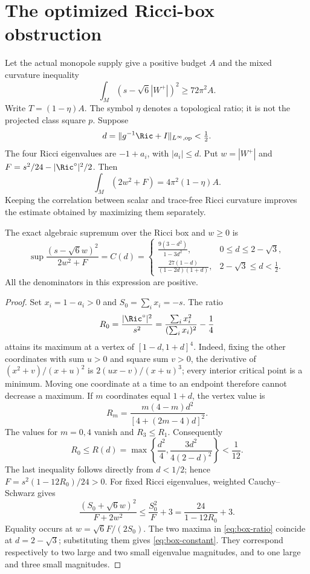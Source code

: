 \section{The optimized Ricci-box obstruction}
\label{sec:ricci-box-optimization}
Let the actual monopole supply give a positive budget $A$ and the mixed
curvature inequality
\begin{equation}\label{eq:box-input}
 \int_M(s-\sqrt6|W^+|)^2\ge72\pi^2A.
\end{equation}
Write $T=(1-\eta)A$. The symbol $\eta$ denotes a topological ratio;
it is not the projected class square $p$. Suppose
\[
 d=\|g^{-1}\Ric+I\|_{L^\infty,\mathrm{op}}<\tfrac12.
\]
The four Ricci eigenvalues are $-1+a_i$, with $|a_i|\le d$. Put
$w=|W^+|$ and $F=s^2/24-|\Ric^\circ|^2/2$. Then
\begin{equation}\label{eq:box-cw}
 \int_M(2w^2+F)=4\pi^2(1-\eta)A.
\end{equation}
Keeping the correlation between scalar and trace-free Ricci curvature
improves the estimate obtained by maximizing them separately.

\begin{proposition}\label{prop:box-optimization}
The exact algebraic supremum over the Ricci box and $w\ge0$ is
\begin{equation}\label{eq:box-constant}
 \sup\frac{(s-\sqrt6w)^2}{2w^2+F}=C(d)=
 \begin{cases}
 \displaystyle\frac{9(3-d^2)}{1-3d^2},&0\le d\le2-\sqrt3,\\[2mm]
 \displaystyle\frac{27(1-d)}{(1-2d)(1+d)},&2-\sqrt3\le d<\tfrac12.
 \end{cases}
\end{equation}
All the denominators in this expression are positive.
\end{proposition}
\begin{proof}
Set $x_i=1-a_i>0$ and $S_0=\sum_i x_i=-s$. The ratio
\[
 R_0=\frac{|\Ric^\circ|^2}{s^2}
     =\frac{\sum_i x_i^2}{(\sum_i x_i)^2}-\frac14
\]
attains its maximum at a vertex of $[1-d,1+d]^4$. Indeed, fixing the
other coordinates with sum $u>0$ and square sum $v>0$, the derivative
of $(x^2+v)/(x+u)^2$ is $2(ux-v)/(x+u)^3$; every interior critical
point is a minimum. Moving one coordinate at a time to an endpoint
therefore cannot decrease a maximum. If $m$ coordinates equal $1+d$,
the vertex value is
\[
 R_m=\frac{m(4-m)d^2}{[4+(2m-4)d]^2}.
\]
The values for $m=0,4$ vanish and $R_3\le R_1$. Consequently
\begin{equation}\label{eq:box-ratio}
 R_0\le R(d)=\max\left\{\frac{d^2}{4},
                     \frac{3d^2}{4(2-d)^2}\right\}<\frac1{12}.
\end{equation}
The last inequality follows directly from $d<1/2$; hence
$F=s^2(1-12R_0)/24>0$. For fixed Ricci eigenvalues, weighted
Cauchy--Schwarz gives
\[
 \frac{(S_0+\sqrt6w)^2}{F+2w^2}
 \le\frac{S_0^2}{F}+3=\frac{24}{1-12R_0}+3.
\]
Equality occurs at $w=\sqrt6F/(2S_0)$. The two maxima in
\eqref{eq:box-ratio} coincide at $d=2-\sqrt3$; substituting them
gives \eqref{eq:box-constant}. They correspond respectively to two
large and two small eigenvalue magnitudes, and to one large and three
small magnitudes.
\end{proof}

